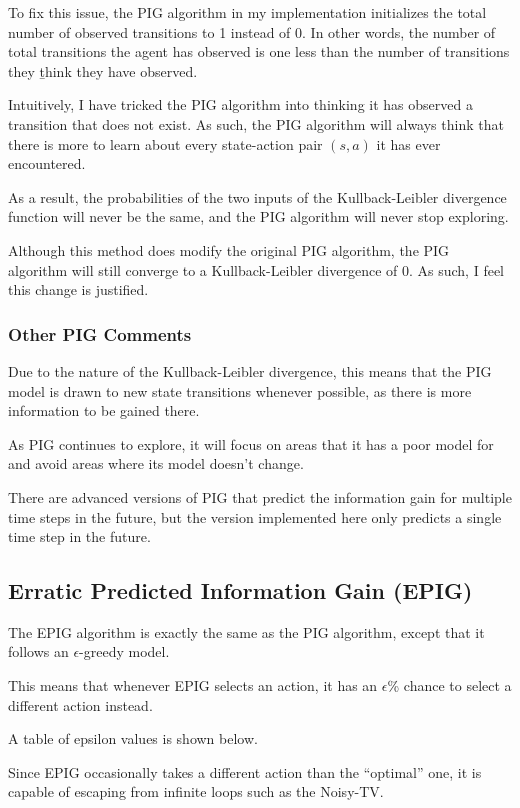 \documentclass[12pt]{thesis}
\begin{document}
To fix this issue, the PIG algorithm in my implementation initializes the total number of observed transitions to 1 instead of 0. In other words, the number of total transitions the agent has observed is one less than the number of transitions they \b{think} they have observed.

Intuitively, I have tricked the PIG algorithm into thinking it has observed a transition that does not exist. As such, the PIG algorithm will always think that there is more to learn about every state-action pair $(s,a)$ it has ever encountered.

As a result, the probabilities of the two inputs of the Kullback-Leibler divergence function will never be the same, and the PIG algorithm will never stop exploring.

Although this method does modify the original PIG algorithm, the PIG algorithm will still converge to a Kullback-Leibler divergence of 0. As such, I feel this change is justified.

\subsubsection{Other PIG Comments} 
Due to the nature of the Kullback-Leibler divergence, this means that the PIG model is drawn to new state transitions whenever possible, as there is more information to be gained there.

As PIG continues to explore, it will focus on areas that it has a poor model for and avoid areas where its model doesn't change.

There are advanced versions of PIG that predict the information gain for multiple time steps in the future, but the version implemented here only predicts a single time step in the future. 
\subsection{Erratic Predicted Information Gain (EPIG)}
The EPIG algorithm is exactly the same as the PIG algorithm, except that it follows an $\epsilon$-greedy model.

This means that whenever EPIG selects an action, it has an $\epsilon$\% chance to select a different action instead.

A table of epsilon values is shown below.

Since EPIG occasionally takes a different action than the ``optimal'' one, it is capable of escaping from infinite loops such as the Noisy-TV.
\end{document}
